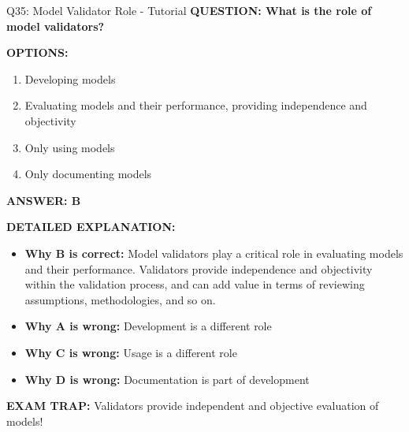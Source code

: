 \documentclass[8pt]{beamer}
\begin{document}
	\begin{frame}{Q35: Model Validator Role - Tutorial}
		\fontsize{6.5}{7.5}\selectfont
		\textbf{QUESTION: What is the role of model validators?}
		
		\vspace{0.1cm}
		\textbf{OPTIONS:}
		\begin{enumerate}
			\item Developing models
			\item Evaluating models and their performance, providing independence and objectivity
			\item Only using models
			\item Only documenting models
		\end{enumerate}
		
		\vspace{0.1cm}
		\textcolor{myblue}{\textbf{ANSWER: B}}
		
		\vspace{0.1cm}
		\textbf{DETAILED EXPLANATION:}
		\begin{itemize}
			\item \textbf{Why B is correct:} Model validators play a critical role in evaluating models and their performance. Validators provide independence and objectivity within the validation process, and can add value in terms of reviewing assumptions, methodologies, and so on.
			\item \textbf{Why A is wrong:} Development is a different role
			\item \textbf{Why C is wrong:} Usage is a different role
			\item \textbf{Why D is wrong:} Documentation is part of development
		\end{itemize}
		
		\textcolor{myred}{\textbf{EXAM TRAP:}} Validators provide \textcolor{myblue}{independent and objective evaluation} of models!
	\end{frame}
	
	
\end{document}
